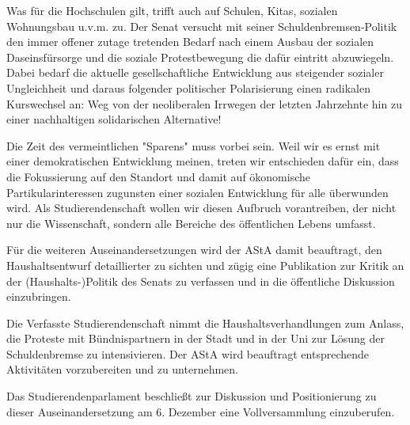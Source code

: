 \documentclass[ngerman,headheight=70pt]{scrartcl}
\begin{document}
    Was für die Hochschulen gilt, trifft auch auf Schulen, Kitas, sozialen
    Wohnungsbau u.v.m. zu. Der Senat versucht mit seiner Schuldenbremsen-Politik
    den immer offener zutage tretenden Bedarf nach einem Ausbau der sozialen
    Daseinsfürsorge und die soziale Protestbewegung die dafür eintritt
    abzuwiegeln. Dabei bedarf die aktuelle gesellschaftliche Entwicklung aus
    steigender sozialer Ungleichheit und daraus folgender politischer
    Polarisierung einen radikalen Kurswechsel an: Weg von der neoliberalen
    Irrwegen der letzten Jahrzehnte hin zu einer nachhaltigen solidarischen
    Alternative!

    Die Zeit des vermeintlichen "Sparens" muss vorbei sein. Weil wir es ernst
    mit einer demokratischen Entwicklung meinen,  treten wir entschieden dafür
    ein, dass die Fokussierung auf den Standort und damit auf ökonomische
    Partikularinteressen zugunsten einer sozialen Entwicklung für alle überwunden
    wird. Als Studierendenschaft wollen wir diesen Aufbruch vorantreiben, der
    nicht nur die Wissenschaft, sondern alle Bereiche des öffentlichen Lebens
    umfasst.

    Für die weiteren Auseinandersetzungen wird der AStA damit beauftragt, den
    Haushaltsentwurf detaillierter zu sichten und zügig eine Publikation zur
    Kritik an der (Haushalts-)Politik des Senats zu verfassen und in die
    öffentliche Diskussion einzubringen.

    Die Verfasste Studierendenschaft nimmt die Haushaltsverhandlungen zum Anlass,
    die Proteste mit Bündnispartnern in der Stadt und in der Uni zur Lösung der
    Schuldenbremse zu intensivieren. Der AStA wird beauftragt entsprechende
    Aktivitäten vorzubereiten und zu unternehmen.

    Das Studierendenparlament beschließt zur Diskussion und Positionierung zu
    dieser Auseinandersetzung am 6. Dezember eine Vollversammlung einzuberufen.
\end{document}
